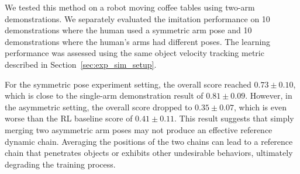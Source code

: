 We tested this method on a robot moving coffee tables using two-arm demonstrations. We separately evaluated the imitation performance on 10 demonstrations where the human used a symmetric arm pose and 10 demonstrations where the human's arms had different poses. The learning performance was assessed using the same object velocity tracking metric described in Section~\ref{sec:exp_sim_setup}. 

For the symmetric pose experiment setting, the overall score reached $0.73\pm0.10$, which is close to the single-arm demonstration result of $0.81\pm0.09$. However, in the asymmetric setting, the overall score dropped to $0.35\pm0.07$, which is even worse than the RL baseline score of $0.41\pm0.11$. This result suggests that simply merging two asymmetric arm poses may not produce an effective reference dynamic chain. Averaging the positions of the two chains can lead to a reference chain that penetrates objects or exhibits other undesirable behaviors, ultimately degrading the training process.






